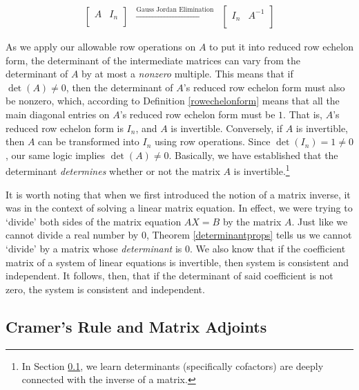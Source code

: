 \[ \begin{array}{ccc}

\left[ \begin{array}{c|c} A & I_{n} \\ \end{array} \right]

&
\xrightarrow{\text{Gauss Jordan Elimination}}

&

\left[ \begin{array}{c|c} I_{n} & A^{-1} \\ \end{array} \right] 

\end{array}\]

As we apply our allowable row operations on $A$ to put it into reduced row echelon form, the determinant of the intermediate matrices can vary from the determinant of $A$ by at most a \textit{nonzero} multiple.  This means that if $\det(A) \neq 0$, then the determinant of $A$'s reduced row echelon form must also be nonzero, which, according to Definition \ref{rowechelonform} means that all the main diagonal entries on $A$'s reduced row echelon form must be $1$.  That is, $A$'s reduced row echelon form is $I_{n}$, and $A$ is invertible. Conversely, if $A$ is invertible, then $A$ can be transformed into $I_{n}$ using row operations.  Since $\det\left(I_{n}\right) = 1 \neq 0$, our same logic implies $\det(A) \neq 0$. Basically, we have established that the determinant \textit{determines} whether or not the matrix $A$ is invertible.\footnote{In Section \ref{CramersRuleMatrixAdjoints}, we learn determinants (specifically cofactors) are deeply connected with the inverse of a matrix.}  

\smallskip

It is worth noting that when we first introduced the notion of a matrix inverse, it was in the context of solving a linear matrix equation.  In effect, we were trying to `divide' both sides of the matrix equation $AX = B$ by the matrix $A$.  Just like we cannot divide a real number by $0$, Theorem \ref{determinantprops} tells us we cannot `divide' by a matrix whose \textit{determinant} is $0$.  We also know that if the coefficient matrix of a system of linear equations is invertible, then system is consistent and independent.  It follows, then, that if the determinant of said coefficient is not zero, the system is consistent and independent.  

\subsection{Cramer's Rule and Matrix Adjoints}
\label{CramersRuleMatrixAdjoints}

